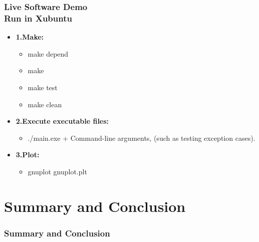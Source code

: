 \documentclass[ucs,10pt]{beamer}
\begin{document}
\begin{frame}
\frametitle{Live Software Demo \\
	\small \color{rwth-blue} Run in Xubuntu}
	\begin{itemize}	
            \item \textbf{1.Make:}
				\begin{itemize}
				\item make depend
				\item make
				\item make test
				\item make clean
				\end{itemize}
			\item \textbf{2.Execute executable files:}
				\begin{itemize}
				\item ./main.exe + Command-line arguments, (such as testing exception cases).
				\end{itemize}
			\item \textbf{3.Plot:}
				\begin{itemize}
				\item gnuplot gnuplot.plt
				\end{itemize}
	\end{itemize}
\end{frame}



\section{Summary and Conclusion}

\begin{frame}
\frametitle{Summary and Conclusion}
\end{frame}
\end{document}
